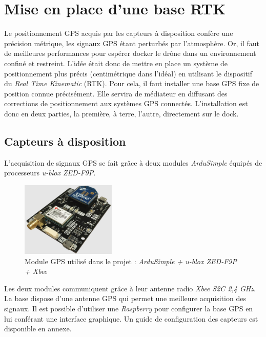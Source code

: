 \documentclass[12pt]{report}
\begin{document}
\section{Mise en place d'une base RTK}
Le positionnement GPS acquis par les capteurs à disposition confère une précision métrique, les signaux GPS étant perturbés par l'atmosphère. Or, il faut de meilleures performances pour espérer docker le drône dans un environnement confiné et restreint. 
L'idée était donc de mettre en place un système de positionnement plus précis (centimétrique dans l'idéal) en  utilisant le dispositif du \textit{Real Time Kinematic} (RTK).
Pour cela, il faut installer une base GPS fixe de position connue précisément. Elle servira de médiateur en diffusant des corrections de positionnement aux systèmes GPS connectés.
L'installation est donc en deux parties, la première, à terre, l'autre, directement sur le dock.
\subsection{Capteurs à disposition}
L'acquisition de signaux GPS se fait grâce à deux modules \textit{ArduSimple} équipés de processeurs \textit{u-blox ZED-F9P}. 
\begin{figure}[H]
  \centering
  \includegraphics[width=0.4\textwidth]{imgs/ardusimple.png}
  \caption{Module GPS utilisé dans le projet : \textit{ArduSimple + u-blox ZED-F9P + Xbee}}
  \label{fig:moduleArduSimple}
\end{figure}

Les deux modules communiquent grâce à leur antenne radio \textit{Xbee S2C 2,4 GHz}. La base dispose d'une antenne GPS qui permet une meilleure acquisition des signaux. 
Il est possible d'utiliser une \textit{Raspberry} pour configurer la base GPS en lui conférant une interface graphique. Un guide de configuration des capteurs est disponible en annexe.
\end{document}
